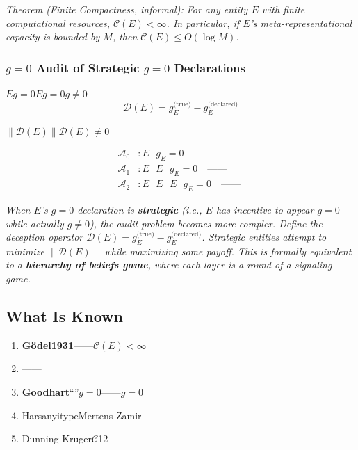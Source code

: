 \documentclass[12pt,a4paper]{article}
\theoremstyle{remark}
\newcommand{\D}{\mathcal{D}}
\newcommand{\A}{\mathcal{A}}
\begin{document}
\medskip
\noindent\textit{Theorem (Finite Compactness, informal): For any entity $E$ with finite computational resources, $\mathcal{C}(E) < \infty$. In particular, if $E$'s meta-representational capacity is bounded by $M$, then $\mathcal{C}(E) \leq O(\log M)$.}

\subsubsection{$g=0$ Audit of Strategic $g=0$ Declarations}

$E$$g=0$\textbf{}$E$$g=0$$g \neq 0$\textbf{}
\begin{equation}
    \D(E) = g_E^{\text{(true)}} - g_E^{\text{(declared)}}
\end{equation}

$\|\D(E)\|$$\D(E) \neq 0$


\begin{align}
    \A_0 &: E \text{  } g_E = 0 \quad \text{—— } \\
    \A_1 &: E \text{  } E \text{  } g_E = 0 \quad \text{—— } \\
    \A_2 &: E \text{  } E \text{  } E \text{  } g_E = 0 \quad \text{—— }
\end{align}

\textbf{}

\medskip
\noindent\textit{When $E$'s $g=0$ declaration is \textbf{strategic} (i.e., $E$ has incentive to appear $g=0$ while actually $g \neq 0$), the audit problem becomes more complex. Define the deception operator $\D(E) = g_E^{\text{(true)}} - g_E^{\text{(declared)}}$. Strategic entities attempt to minimize $\|\D(E)\|$ while maximizing some payoff. This is formally equivalent to a \textbf{hierarchy of beliefs game}, where each layer is a round of a signaling game.}

\subsection{ What Is Known}

\begin{enumerate}[label=(\arabic*)]
    \item \textbf{Gödel1931}——$\mathcal{C}(E) < \infty$
    
    \item \textbf{}——
    
    \item \textbf{Goodhart}“”$g=0$——$g=0$
    
    \item \textbf{}HarsanyitypeMertens-Zamir——
    
    \item \textbf{}Dunning-Kruger$\mathcal{C}$12
\end{enumerate}
\end{document}
